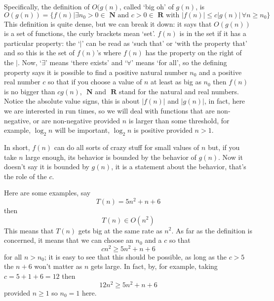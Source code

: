 \documentclass[11pt,a4paper]{scrartcl}
\begin{document}
Specifically, the definition of $O(g(n)$, called \lq{}big oh\rq{} of
$g(n)$, is
\begin{equation}
O(g(n))=\{f(n)| \exists n_0>0\in \textbf{ N}\mbox{ and }c>0\in \textbf{ R}\mbox{ with }|f(n)|\le c|g(n)|\,\forall n\ge n_0\}
\end{equation}
This definition is quite dense, but we can break it down: it says that
$O(g(n))$ is a set of functions, the curly brackets mean
\lq{}set\rq{}. $f(n)$ is in the set if it has a particular
property: the \lq$|$\rq{} can be read as \lq{}such that\rq{} or
\lq{}with the property that\rq{} and so this is the set of $f(n)$'s
where $f(n)$ has the property on the right of the $|$. Now,
\lq{}$\exists$\rq{} means \lq{}there exists\rq{} and
\lq{}$\forall$\rq{} means \lq{}for all\rq{}, so the defining property
says it is possible to find a positive natural number $n_0$ and a
positive real number $c$ so that if you choose a value of $n$ at
least as big as $n_0$ then $f(n)$ is no bigger than $cg(n)$, $\textbf{ N}$
and $\textbf{ R}$ stand for the natural and real numbers. Notice the
absolute value signs, this is about $|f(n)|$ and $|g(n)|$, in fact,
here we are interested in run times, so we will deal with functions
that are non-negative, or are non-negative provided $n$ is larger than
some threshold, for example, $\log_2{n}$ will be important,
$\log_2{n}$ is positive provided $n>1$.

In short, $f(n)$ can do all sorts of crazy stuff for small values of
$n$ but, if you take $n$ large enough, its behavior is bounded by the
behavior of $g(n)$. Now it doesn't say it is bounded by $g(n)$, it is
a statement about the behavior, that's the role of the $c$.

Here are some examples, say 
\begin{equation}
T(n)=5n^2+n+6
\end{equation}
then 
\begin{equation}
T(n)\in O(n^2)
\end{equation}
This means that $T(n)$ gets big at the same rate as $n^2$. As far as the definition is concerned, it means that we can choose an $n_0$ and a $c$ so that
\begin{equation}
cn^2\ge 5n^2+n+6
\end{equation}
for all $n>n_0$; it is easy to see that this should be possible, as
long as the $c>5$ the $n+6$ won't matter as $n$ gets large. In fact,
by, for example, taking $c=5+1+6=12$ then
\begin{equation}
12n^2\ge 5n^2+n+6
\end{equation}
provided $n\ge 1$ so $n_0=1$ here. 
\end{document}
